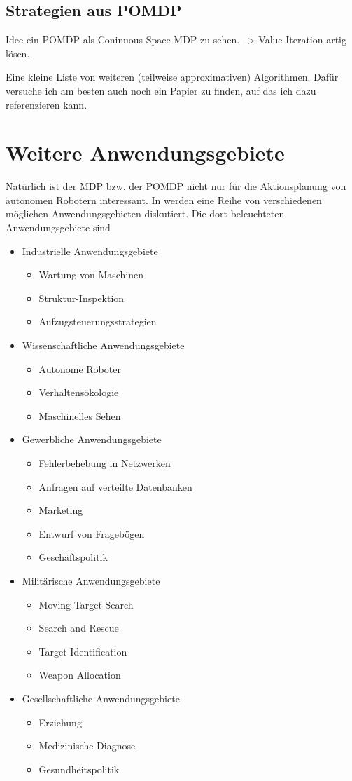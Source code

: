 \documentclass[a4paper]{IEEEtran}
\begin{document}
\subsection{Strategien aus POMDP}
Idee ein POMDP als Coninuous Space MDP zu sehen. --> Value Iteration artig lösen.

Eine kleine Liste von weiteren (teilweise approximativen) Algorithmen. Dafür versuche ich am besten auch noch ein Papier zu finden, auf das ich dazu referenzieren kann.

\section{Weitere Anwendungsgebiete}
Natürlich ist der MDP bzw. der POMDP nicht nur für die Aktionsplanung von autonomen Robotern interessant. In \cite{cassandra1998survey} werden eine Reihe von verschiedenen möglichen Anwendungsgebieten diskutiert. Die dort beleuchteten Anwendungsgebiete sind
\begin{itemize}
	\item Industrielle Anwendungsgebiete
	\begin{itemize}
		\item Wartung von Maschinen
		\item Struktur-Inspektion
		\item Aufzugsteuerungsstrategien
	\end{itemize}
	\item Wissenschaftliche Anwendungsgebiete
	\begin{itemize}
		\item Autonome Roboter
		\item Verhaltensökologie
		\item Maschinelles Sehen
	\end{itemize}
	\item Gewerbliche Anwendungsgebiete
	\begin{itemize}
		\item Fehlerbehebung in Netzwerken
		\item Anfragen auf verteilte Datenbanken
		\item Marketing
		\item Entwurf von Fragebögen
		\item Geschäftspolitik
	\end{itemize}
	\item Militärische Anwendungsgebiete
	\begin{itemize}
		\item Moving Target Search %
		\item Search and Rescue
		\item Target Identification
		\item Weapon Allocation
	\end{itemize}
	\item Gesellschaftliche Anwendungsgebiete
	\begin{itemize}
		\item Erziehung
		\item Medizinische Diagnose
		\item Gesundheitspolitik
	\end{itemize}
\end{itemize}



\end{document}
